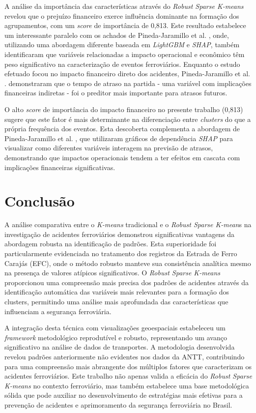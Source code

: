 \documentclass[conference]{IEEEtran}
\begin{document}
A análise da importância das características através do \textit{Robust Sparse K-means} revelou que o prejuízo financeiro exerce influência dominante na formação dos agrupamentos, com um \textit{score} de importância de 0,813. Este resultado estabelece um interessante paralelo com os achados de Pineda-Jaramillo et al. \cite{pineda2023short}, onde, utilizando uma abordagem diferente baseada em \textit{LightGBM} e \textit{SHAP}, também identificaram que variáveis relacionadas a impacto operacional e econômico têm peso significativo na caracterização de eventos ferroviários. Enquanto o estudo efetuado focou no impacto financeiro direto dos acidentes, Pineda-Jaramillo et al. \cite{pineda2023short}. demonstraram que o tempo de atraso na partida - uma variável com implicações financeiras indiretas - foi o preditor mais importante para atrasos futuros.

O alto \textit{score} de importância do impacto financeiro no presente trabalho (0,813) sugere que este fator é mais determinante na diferenciação entre \textit{clusters} do que a própria frequência dos eventos. Esta descoberta complementa a abordagem de Pineda-Jaramillo et al. \cite{pineda2023short}, que utilizaram gráficos de dependência \textit{SHAP} para visualizar como diferentes variáveis interagem na previsão de atrasos, demonstrando que impactos operacionais tendem a ter efeitos em cascata com implicações financeiras significativas.


\section{Conclusão}

A análise comparativa entre o \textit{K-means} tradicional e o \textit{Robust Sparse K-mean}s na investigação de acidentes ferroviários demonstrou significativas vantagens da abordagem robusta na identificação de padrões. Esta superioridade foi particularmente evidenciada no tratamento dos registros da Estrada de Ferro Carajás (EFC), onde o método robusto manteve sua consistência analítica mesmo na presença de valores atípicos significativos. O \textit{Robust Sparse K-means} proporcionou uma compreensão mais precisa dos padrões de acidentes através da identificação automática das variáveis mais relevantes para a formação dos clusters, permitindo uma análise mais aprofundada das características que influenciam a segurança ferroviária.

A integração desta técnica com visualizações geoespaciais estabeleceu um \textit{framework} metodológico reprodutível e robusto, representando um avanço significativo na análise de dados de transportes. A metodologia desenvolvida revelou padrões anteriormente não evidentes nos dados da ANTT, contribuindo para uma compreensão mais abrangente dos múltiplos fatores que caracterizam os acidentes ferroviários. Este trabalho não apenas valida a eficácia do \textit{Robust Sparse K-means} no contexto ferroviário, mas também estabelece uma base metodológica sólida que pode auxiliar no desenvolvimento de estratégias mais efetivas para a prevenção de acidentes e aprimoramento da segurança ferroviária no Brasil.
\end{document}
